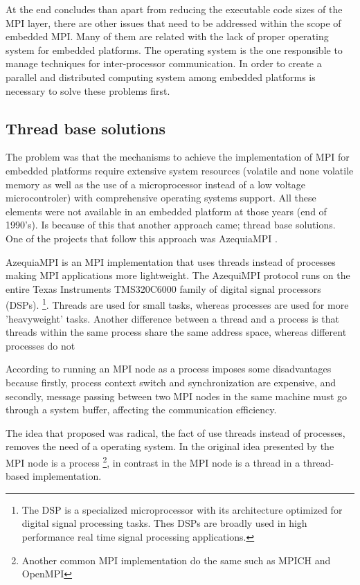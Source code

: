 At the end \cite{McMahon} concludes than apart from  reducing the executable
code sizes of the MPI layer, there are other issues that need
to be addressed within the scope of embedded MPI. Many of them are related with
the lack of proper operating system for embedded platforms. The operating
system is the one responsible to manage techniques for inter-processor
communication.  In order to create a parallel and distributed computing system
among embedded platforms is necessary to solve these problems first.


\subsection{Thread base solutions}

The problem was that the mechanisms to achieve the implementation of MPI for
embedded platforms require extensive system resources (volatile and none
volatile memory as well as the use of a microprocessor instead of a low voltage
microcontroler) with comprehensive operating systems support. All these
elements were not available in an embedded platform at those years (end of
1990's). Is because of this that another approach came; thread base solutions.
One of the projects that follow this approach was AzequiaMPI \cite{Gallego}.

AzequiaMPI is an MPI implementation that uses threads instead of processes
making MPI applications more lightweight. The AzequiMPI protocol runs on the
entire Texas Instruments TMS320C6000 family of digital signal processors
(DSPs). \footnote{The DSP is a specialized microprocessor
with its architecture optimized for digital signal processing tasks. Thes DSPs
are broadly used in high performance real time signal processing
applications.}. Threads are used for small tasks, whereas processes are used
for more 'heavyweight' tasks. Another
difference between a thread and a process is that threads within the same
process share the same address space, whereas different processes do not

According to \cite{Gallego} running an MPI node as a process imposes some
disadvantages because firstly, process context switch and synchronization are
expensive, and secondly, message passing between two MPI nodes in the same
machine must go through a system buffer, affecting  the communication
efficiency. 

The idea that \cite{Gallego} proposed was radical, the fact of use threads
instead of processes, removes the need of a operating system. In the original
idea presented by \cite{Salim} the MPI node  is a process \footnote{Another
common  MPI implementation do the same such as MPICH and OpenMPI},  in contrast
in \cite{Gallego} the MPI node is a thread in a thread-based implementation.


